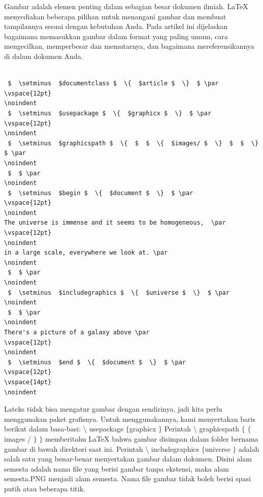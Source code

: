 \noindent 
\vspace{10pt}
\noindent 
{\fontsize{10pt}{10pt}\selectfont  \hspace*{0.64in} Gambar adalah elemen penting dalam sebagian besar dokumen ilmiah. LaTeX menyediakan beberapa pilihan untuk menangani gambar dan membuat tampilannya sesuai dengan kebutuhan Anda. Pada artikel ini dijelaskan bagaimana memasukkan gambar dalam format yang paling umum, cara mengecilkan, memperbesar dan memutarnya, dan bagaimana mereferensikannya di dalam dokumen Anda.} \par
\vspace{12pt}
\noindent 
\begin{verbatim}

 $  \setminus  $documentclass $  \{  $article $  \}  $ \par
\vspace{12pt}
\noindent 
 $  \setminus  $usepackage $  \{  $graphicx $  \}  $ \par
\vspace{12pt}
\noindent 
 $  \setminus  $graphicspath $  \{  $  $  \{  $images/ $  \}  $  $  \}  $ \par
\noindent 
 $  $ \par
\noindent 
 $  \setminus  $begin $  \{  $document $  \}  $ \par
\vspace{12pt}
\noindent 
The universe is immense and it seems to be homogeneous,  \par
\vspace{12pt}
\noindent 
in a large scale, everywhere we look at. \par
\noindent 
 $  $ \par
\noindent 
 $  \setminus  $includegraphics $  \{  $universe $  \}  $ \par
\noindent 
 $  $ \par
\noindent 
There's a picture of a galaxy above \par
\vspace{12pt}
\noindent 
 $  \setminus  $end $  \{  $document $  \}  $ \par
\vspace{12pt}
\vspace{14pt}
\noindent 
\end{verbatim}
 \hspace*{0.5in} Lateks tidak bisa mengatur gambar dengan sendirinya, jadi kita perlu menggunakan paket grafisnya. Untuk menggunakannya, kami menyertakan baris berikut dalam basa-basi:  $  \setminus  $ usepackage  $  \{  $graphicx $  \}  $ Perintah  $  \setminus  $ graphicspath  $  \{  $ $  \{  $images / $  \}  $ $  \}  $ memberitahu LaTeX bahwa gambar disimpan dalam folder bernama gambar di bawah direktori saat ini. Perintah  $  \setminus  $ includegraphics  $  \{  $universe $  \}  $ adalah salah satu yang benar-benar menyertakan gambar dalam dokumen. Disini alam semesta adalah nama file yang berisi gambar tanpa ekstensi, maka alam semesta.PNG menjadi alam semesta. Nama file gambar tidak boleh berisi spasi putih atau beberapa titik. \par

